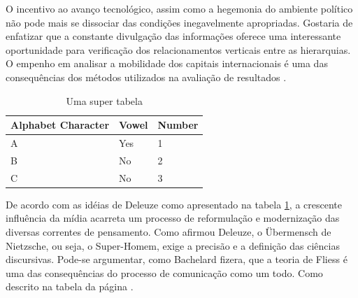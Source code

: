 \documentclass[font=plain,chapter=TITLE,section=Title,espaco=duplo,tocpage=plain,appendix=Name,floatnumber=continuous]{abnt}
\begin{document}
O incentivo ao avanço tecnológico, assim como a hegemonia do ambiente
político não pode mais se dissociar das condições inegavelmente
apropriadas. Gostaria de enfatizar que a constante divulgação das
informações oferece uma interessante oportunidade para verificação dos
relacionamentos verticais entre as hierarquias. O empenho em analisar a
mobilidade dos capitais internacionais é uma das consequências dos métodos
utilizados na avaliação de resultados \cite{semolini2002support}.

\begin{table}[h!b!p!]
\centering
\begin{tabular}{|l|l|l|}
\hline
Alphabet Character & Vowel & Number \\
\hline
A & Yes & 1 \\
B & No & 2 \\
C & No & 3 \\
\hline
\end{tabular}
\caption{Uma super tabela}
\label{tab:seila} %
\end{table}

%
%
%
%
De acordo com as idéias de Deleuze como apresentado na tabela \ref{tab:seila},
a crescente influência da mídia acarreta um processo de
reformulação e modernização das diversas correntes de pensamento.  Como
afirmou Deleuze, o Übermensch de Nietzsche, ou seja, o Super-Homem, exige a
precisão e a definição das ciências discursivas.  Pode-se argumentar, como
Bachelard fizera, que a teoria de Fliess é uma das consequências do
processo de comunicação como um todo. Como descrito na tabela da
página \pageref{tab:seila}.
\end{document}
